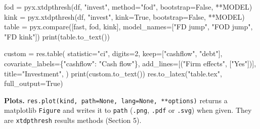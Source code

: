 \documentclass[
  10.5pt,
  a4paper,
]{article}
\newenvironment{Shaded}{}{}
\newcommand{\BuiltInTok}[1]{\textcolor[rgb]{0.00,0.50,0.00}{#1}}
\newcommand{\DecValTok}[1]{\textcolor[rgb]{0.25,0.63,0.44}{#1}}
\newcommand{\NormalTok}[1]{#1}
\newcommand{\OperatorTok}[1]{\textcolor[rgb]{0.40,0.40,0.40}{#1}}
\newcommand{\StringTok}[1]{\textcolor[rgb]{0.25,0.44,0.63}{#1}}
\newcommand{\VariableTok}[1]{\textcolor[rgb]{0.10,0.09,0.49}{#1}}
\begin{document}
\begin{Shaded}
\begin{Highlighting}[]
\NormalTok{fod }\OperatorTok{=}\NormalTok{ pyx.xtdpthresh(df, }\StringTok{"invest"}\NormalTok{, method}\OperatorTok{=}\StringTok{"fod"}\NormalTok{, bootstrap}\OperatorTok{=}\VariableTok{False}\NormalTok{, }\OperatorTok{**}\NormalTok{MODEL)}
\NormalTok{kink }\OperatorTok{=}\NormalTok{ pyx.xtdpthresh(df, }\StringTok{"invest"}\NormalTok{, kink}\OperatorTok{=}\VariableTok{True}\NormalTok{, bootstrap}\OperatorTok{=}\VariableTok{False}\NormalTok{, }\OperatorTok{**}\NormalTok{MODEL)}
\NormalTok{table }\OperatorTok{=}\NormalTok{ pyx.compare([fast, fod, kink], model\_names}\OperatorTok{=}\NormalTok{[}\StringTok{"FD jump"}\NormalTok{, }\StringTok{"FOD jump"}\NormalTok{, }\StringTok{"FD kink"}\NormalTok{])}
\BuiltInTok{print}\NormalTok{(table.to\_text())}

\NormalTok{custom }\OperatorTok{=}\NormalTok{ res.table(}
\NormalTok{    statistic}\OperatorTok{=}\StringTok{"ci"}\NormalTok{,}
\NormalTok{    digits}\OperatorTok{=}\DecValTok{2}\NormalTok{,}
\NormalTok{    keep}\OperatorTok{=}\NormalTok{[}\StringTok{"cashflow"}\NormalTok{, }\StringTok{"debt"}\NormalTok{],}
\NormalTok{    covariate\_labels}\OperatorTok{=}\NormalTok{\{}\StringTok{"cashflow"}\NormalTok{: }\StringTok{"Cash flow"}\NormalTok{\},}
\NormalTok{    add\_lines}\OperatorTok{=}\NormalTok{[(}\StringTok{"Firm effects"}\NormalTok{, [}\StringTok{"Yes"}\NormalTok{])],}
\NormalTok{    title}\OperatorTok{=}\StringTok{"Investment"}\NormalTok{,}
\NormalTok{)}
\BuiltInTok{print}\NormalTok{(custom.to\_text())}
\NormalTok{res.to\_latex(}\StringTok{"table.tex"}\NormalTok{, full\_output}\OperatorTok{=}\VariableTok{True}\NormalTok{)}
\end{Highlighting}
\end{Shaded}

\textbf{Plots.}
\texttt{res.plot(kind,\ path=None,\ lang=None,\ **options)} returns a
matplotlib \texttt{Figure} and writes it to \texttt{path}
(\texttt{.png}, \texttt{.pdf} or \texttt{.svg}) when given. They are
\texttt{xtdpthresh} results\textquotesingle{} methods (Section 5).
\end{document}
